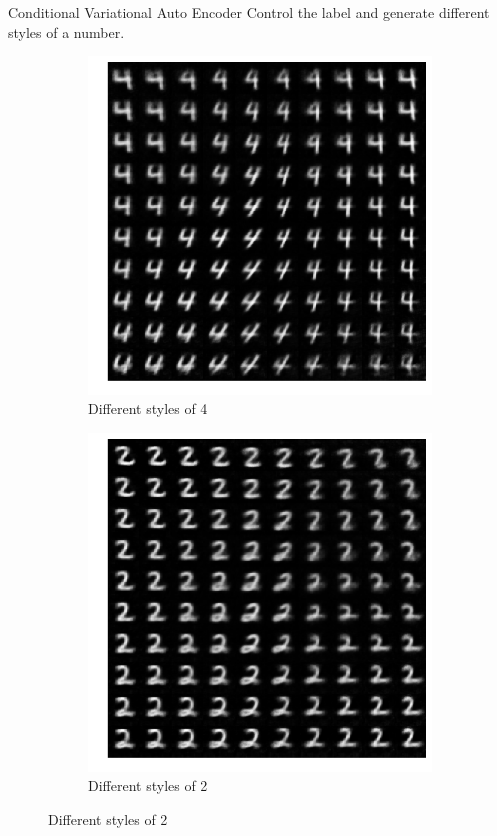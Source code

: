 \documentclass[11pt]{beamer} %
\begin{document}
\begin{frame}{Conditional Variational Auto Encoder}
Control the label and generate different styles of a number.
\begin{figure}
    \centering
    \begin{subfigure}[h]{0.45\linewidth}
        \centering
        \includegraphics[width=1.0\textwidth]{img/cvae_4.png}
        \caption{Different styles of 4}
    \end{subfigure}
    \begin{subfigure}[h]{0.45\linewidth}
        \centering
        \includegraphics[width=1.0\textwidth]{img/cvae_2.png}
        \caption{Different styles of 2}
    \end{subfigure}
\end{figure}
\end{frame}
\end{document}
